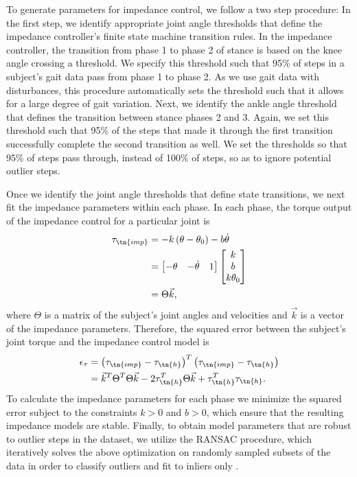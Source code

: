 To generate parameters for impedance control, we follow a two step procedure: In
the first step, we identify appropriate joint angle thresholds that define the
impedance controller's finite state machine transition rules. In the impedance
controller, the transition from phase 1 to phase 2 of stance is based on the
knee angle crossing a threshold. We specify this threshold such that 95\% of
steps in a subject's gait data pass from phase 1 to phase 2. As we use gait data
with disturbances, this procedure automatically sets the threshold such that it
allows for a large degree of gait variation. Next, we identify the ankle angle
threshold that defines the transition between stance phases 2 and 3. Again, we
set this threshold such that 95\% of the steps that made it through the first
transition successfully complete the second transition as well. We set the
thresholds so that 95\% of steps pass through, instead of 100\% of steps, so as
to ignore potential outlier steps.

Once we identify the joint angle thresholds that define state transitions, we
next fit the impedance parameters within each phase. In each phase, the torque
output of the impedance control for a particular joint is 
\begin{align}
    \tau_\tn{imp} &= -k \left( \theta - \theta_0 \right) - b \dot{\theta} \\
        &= \begin{bmatrix} -\theta & -\dot{\theta} & 1 \end{bmatrix}
            \begin{bmatrix} k \\ b \\ k \theta_0 \end{bmatrix} \\
        &= \Theta \vec{k},
\end{align}
where $\Theta$ is a matrix of the subject's joint angles and velocities and
$\vec{k}$ is a vector of the impedance parameters. Therefore, the squared error
between the subject's joint torque and the impedance control model is
\begin{align}
    \epsilon_\tau & = {\left( \tau_\tn{imp} - \tau_\tn{h} \right)}^T 
        \left( \tau_\tn{imp} - \tau_\tn{h} \right) \\
        &= \vec{k}^T \Theta^T \Theta \vec{k} - 2\tau_\tn{h}^T \Theta \vec{k} 
        + \tau_\tn{h}^T \tau_\tn{h}.
\end{align}
To calculate the impedance parameters for each phase we minimize the squared
error subject to the constraints $k>0$ and ${b > 0}$, which ensure that
the resulting impedance models are stable. Finally, to obtain model parameters
that are robust to outlier steps in the dataset, we utilize the RANSAC
procedure, which iteratively solves the above optimization on randomly sampled
subsets of the data in order to classify outliers and fit to inliers only
\citep{fischler1981random}.

